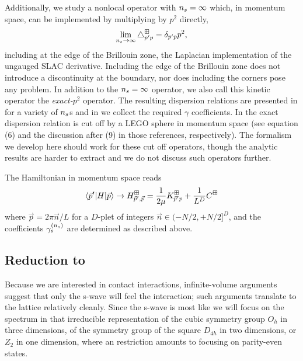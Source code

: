 Additionally, we study a nonlocal operator with ${n_s}=\infty$ which, in momentum space, can be implemented by multiplying by $p^2$ directly,
\begin{equation}
    \lim\limits_{n_s \to \infty}
    \mathop{}\!\mathbin\bigtriangleup^\boxplus_{p'p}
    =
    \delta_{p'p} p^2,
\end{equation}
including at the edge of the Brillouin zone, the Laplacian implementation of the ungauged SLAC derivative.
Including the edge of the Brillouin zone does not introduce a discontinuity at the boundary, nor does including the corners pose any problem.
In addition to the ${n_s}=\infty$ operator, we also call this kinetic operator the \emph{exact-$p^2$} operator.
The resulting dispersion relations are presented in  for a variety of ${n_s}$s and in  we collect the required $\gamma$ coefficients.
In  the exact dispersion relation is cut off by a LEGO sphere in momentum space (see equation (6) and the discussion after (9) in those references, respectively).
The formalism we develop here should work for these cut off operators, though the analytic results are harder to extract and we do not discuss such operators further.

The Hamiltonian in momentum space reads
\begin{equation}
    \label{eq:p space hamiltonian}
    \left\langle \vec{p}' \middle| H \middle| \vec{p} \right\rangle
    \rightarrow
    H_{\vec{p}',\vec{p}}^\boxplus
    =
    \frac{1}{2\mu} K_{\vec{p}'p}^\boxplus
    +\frac{1}{L^D}C^\boxplus
\end{equation}
where $\vec{p} = 2\pi \vec{n}/L$ for a $D$-plet of integers $\vec{n} \in (-N/2, +N/2]^D$, and the coefficients $\gamma_{s}^{({n_s})}$ are determined as described above.


\subsection{Reduction to \Aoneg}

Because we are interested in contact interactions, infinite-volume arguments suggest that only the s-wave will feel the interaction; such arguments translate to the lattice relatively cleanly.
Since the s-wave is most like \Aoneg we will focus on the spectrum in that irreducible representation of the cubic symmetry group $O_h$ in three dimensions, of the symmetry group of the square $D_{4h}$ in two dimensions, or $Z_2$ in one dimension, where an \Aoneg restriction amounts to focusing on parity-even states.

